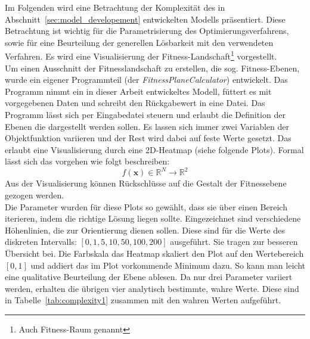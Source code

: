 %
Im Folgenden wird eine Betrachtung der Komplexität des in Abschnitt~\ref{sec:model_developement} entwickelten Modells präsentiert. Diese Betrachtung ist wichtig für die Parametrisierung des Optimierungsverfahrens, sowie für eine Beurteilung der generellen Lösbarkeit mit den verwendeten Verfahren. Es wird eine Visualisierung der Fitness-Landschaft\footnote{Auch Fitness-Raum genannt} vorgestellt.\\
%

Um einen Ausschnitt der Fitnesslandschaft zu erstellen, die sog. Fitness-Ebenen, wurde ein eigener Programmteil (der \textit{FitnessPlaneCalculator}) entwickelt. Das Programm nimmt ein in dieser Arbeit entwickeltes Modell, füttert es mit vorgegebenen Daten und schreibt den Rückgabewert in eine Datei. Das Programm lässt sich per Eingabedatei steuern und erlaubt die Definition der Ebenen die dargestellt werden sollen. Es lassen sich immer zwei Variablen der Objektfunktion variieren und der Rest wird dabei auf feste Werte gesetzt. Das erlaubt eine Visualisierung durch eine 2D-Heatmap (siehe folgende Plots). Formal lässt sich das vorgehen wie folgt beschreiben:
%
\begin{equation}
f(\mathbf{x}) \in \mathbb{R}^{N} \rightarrow \mathbb{R}^{2}\nonumber
\end{equation}
%
Aus der Visualisierung können Rückschlüsse auf die Gestalt der Fitnessebene gezogen werden.\\
%

Die Parameter wurden für diese Plots so gewählt, dass sie über einen Bereich iterieren, indem die richtige Lösung liegen sollte. Eingezeichnet sind verschiedene Höhenlinien, die zur Orientierung dienen sollen. Diese sind für die Werte des diskreten Intervalls: $[0,1,5,10,50,100,200]$ ausgeführt. Sie tragen zur besseren Übersicht bei. Die Farbskala das Heatmap skaliert den Plot auf den Wertebereich $[0,1]$ und addiert das im Plot vorkommende Minimum dazu. So kann man leicht eine qualitative Beurteilung der Ebene ablesen. Da nur drei Parameter variiert werden, erhalten die übrigen vier analytisch bestimmte, wahre Werte. Diese sind in Tabelle~\ref{tab:complexity1} zusammen mit den wahren Werten aufgeführt.\\

